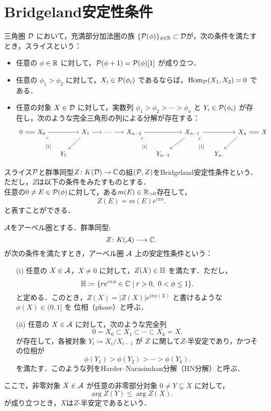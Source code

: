 \section{Bridgeland安定性条件}
\begin{defn}\cite{Bri07}
三角圏 $\D$ において，充満部分加法圏の族 $\{ \P(\phi) \}_{\phi \in \RR} \subset \D$が，次の条件を満たすとき，スライスという：
\begin{itemize}
  \item 任意の $\phi \in \RR$ に対して，$\P(\phi + 1) = \P(\phi)[1]$ が成り立つ．
  \item 任意の $\phi_1 > \phi_2$ に対して，$X_i \in \P(\phi_i)$ であるならば，$\Hom_{\D}(X_1, X_2) = 0$ である．
  \item 任意の対象 $X \in \D$ に対して，実数列 $\phi_1 > \phi_2 > \cdots > \phi_n$ と $Y_i \in \P(\phi_i)$ が存在し，次のような完全三角形の列による分解が存在する：
  \[
    \begin{tikzcd}[column sep=1.5em]
      0 \ar[r, equal] & X_0 \ar[rr] && X_1 \ar[r] \ar[ld] & \cdots \ar[r] & X_{n-2} \ar[rr] && X_{n-1} \ar[ld] \ar[rr] && X_n \ar[ld] \ar[r, equal] & X \\
      && Y_1 \ar[lu, dotted,swap, "{[1]}"'] &&&& Y_{n-1} \ar[lu, dotted,swap, "{[1]}"'] && Y_n \ar[lu, dotted,swap, "{[1]}"'].
    \end{tikzcd}
  \]
\end{itemize}
スライス$\P$と群準同型$Z\colon K(\D)\to \CC$の組$(\P,Z)$をBridgeland安定性条件という．ただし，$Z$は以下の条件をみたすものとする．\\
任意の$0\neq E\in\P(\phi)$に対して，ある$m(E)\in\RR_{>0}$存在して，
\[Z(E) = m(E)e^{i\pi\phi}.\]
と表すことができる．
\end{defn}


\begin{defn}\cite{Bri07}
$\A$をアーベル圏とする．群準同型:
\[
  Z \colon K(\A) \longrightarrow \CC.
\]
が次の条件を満たすとき，アーベル圏 $\A$ 上の安定性条件という：
\begin{itemize}
  \item[(i)] 任意の $X \in \A$，$X \neq 0$ に対して，$Z(X) \in \HH$ を満たす．ただし，
  \[
    \HH \coloneqq \{ re^{i\pi\phi} \in \CC \mid r > 0,\ 0 < \phi \le 1 \}.
  \]
  と定める．このとき，$Z(X) = |Z(X)|e^{i\pi\phi(X)}$ と書けるような $\phi(X) \in (0,1]$ を
  位相（phase）と呼ぶ．
  
  \item[(ii)] 任意の $X \in \A$ に対して，次のような完全列
  \[
    0 = X_0 \subset X_1 \subset \cdots \subset X_k = X.
  \]
  が存在して，各被対象 $Y_i \coloneqq X_i / X_{i-1}$ が $Z$ に関して$Z$-半安定であり，かつその位相が
  \[
    \phi(Y_1) > \phi(Y_2) > \cdots > \phi(Y_k).
  \]
  を満たす．このような列をHarder--Narasimhan分解（HN分解）と呼ぶ．
\end{itemize}

ここで，非零対象 $X \in \A$ が任意の非零部分対象 $0 \neq Y \subsetneq X$ に対して，
\[
  \arg Z(Y) \le \arg Z(X).
\]
が成り立つとき，$X$は$Z$-半安定であるという．
\end{defn}

